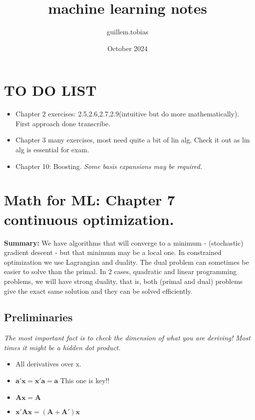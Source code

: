\documentclass{article}
\begin{document}
\title{machine learning notes}
\author{guillem.tobias }
\date{October 2024}


\maketitle
\section{TO DO LIST}
\begin{itemize}
    \item Chapter 2 exercises: 2.5,2.6,2.7,2.9(intuitive but do more mathematically). First approach done transcribe.
    \item Chapter 3 many exercises, most need quite a bit of lin alg. Check it out as lin alg is essential for exam. 
    \item Chapter 10: Boosting. \textit{Some basis expansions may be required.}
\end{itemize}

\section*{Math for ML: Chapter 7 continuous optimization.}
\textbf{Summary:} We have algorithms that will converge to a minimum - (stochastic) gradient descent - but that minimum may be a local one. 
In constrained optimization we use Lagrangian and duality. The dual problem can sometimes be easier to solve than the primal. 
In 2 cases, quadratic and linear programming problems, we will have strong duality, that is, both (primal and dual) problems give 
the exact same solution and they can be solved efficiently.  

\subsection*{Preliminaries}
\textit{The most important fact is to check the dimension of what you are deriving! Most times it might be a hidden dot product.}

\begin{itemize}
    \item All derivatives over x.
    \item $\mathbf{a'x} = \mathbf{x'a} = \mathbf{a} $ This one is key!!
    \item $\mathbf{Ax} = \mathbf{A} $ 
    \item $ \mathbf{x'Ax} = \mathbf{(A + A')x} $
\end{itemize}
\end{document}
